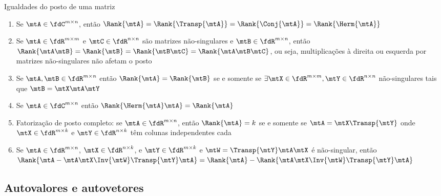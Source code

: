 \begin{frame}{Igualdades do posto de uma matriz~\cite{Horn2012}}
  \begin{enumerate}\addtolength{\itemsep}{0.5\baselineskip}
    \item Se $ \mtA \in \fdC^{m \times n} $, então $ \Rank{\mtA} = \Rank{\Transp{\mtA}} = \Rank{\Conj{\mtA}} = \Rank{\Herm{\mtA}}$
    
    \item Se $ \mtA \in \fdR^{m \times m} $ e $ \mtC \in \fdR^{n \times n} $ são matrizes não-singulares e $ \mtB \in \fdR^{m \times n} $, então $ \Rank{\mtA\mtB} = \Rank{\mtB} = \Rank{\mtB\mtC} = \Rank{\mtA\mtB\mtC} $, ou seja, multiplicações à direita ou esquerda por matrizes não-singulares não afetam o posto
    
    \item Se $ \mtA, \mtB \in \fdR^{m \times n} $  então $ \Rank{\mtA} = \Rank{\mtB} $ se e somente se $ \exists \mtX \in \fdR^{m \times m}, \mtY \in \fdR^{n \times n} $ não-singulares tais que $ \mtB = \mtX \mtA \mtY $

    \item Se $ \mtA \in \fdC^{m \times n} $ então $ \Rank{\Herm{\mtA}\mtA} = \Rank{\mtA} $
    
    \item Fatorização de posto completo: se $ \mtA \in \fdR^{m \times n} $, então $ \Rank{\mtA} = k $ se e somente se $ \mtA =  \mtX \Transp{\mtY} $ onde $\mtX \in \fdR^{m \times k}$  e $ \mtY \in \fdR^{n \times k} $ têm colunas independentes cada
    
    \item Se $ \mtA \in \fdR^{m \times n} $, $ \mtX \in \fdR^{n \times k} $, e $ \mtY \in \fdR^{m \times k}  $ e $ \mtW= \Transp{\mtY}\mtA \mtX $ é não-singular, então $ \Rank{\mtA - \mtA\mtX\Inv{\mtW}\Transp{\mtY}\mtA} = \Rank{\mtA} - \Rank{\mtA \mtX \Inv{\mtW} \Transp{\mtY} \mtA} $
  \end{enumerate}
\end{frame}

\subsection{Autovalores e autovetores}

